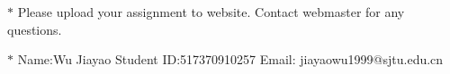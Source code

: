\documentclass[12pt,a4paper]{article}
\theoremstyle{definition}
\begin{document}
\noindent

\noindent{}
\begin{center}
\footnotesize{\color{red}$*$ Please upload your assignment to website. Contact webmaster for any questions.}

\footnotesize{\color{blue}$*$ Name:Wu Jiayao  \quad Student ID:517370910257 \quad Email: jiayaowu1999@sjtu.edu.cn}
\end{center}
\end{document}
